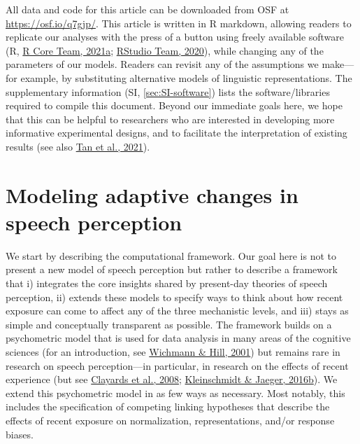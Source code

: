 \documentclass[
  11pt,
  english,
  man,floatsintext]{apa6}
\begin{document}
All data and code for this article can be downloaded from OSF at \url{https://osf.io/q7gjp/}. This article is written in R markdown, allowing readers to replicate our analyses with the press of a button using freely available software (R, \protect\hyperlink{ref-R}{R Core Team, 2021a}; \protect\hyperlink{ref-RStudio}{RStudio Team, 2020}), while changing any of the parameters of our models. Readers can revisit any of the assumptions we make---for example, by substituting alternative models of linguistic representations. The supplementary information (SI, \ref{sec:SI-software}) lists the software/libraries required to compile this document. Beyond our immediate goals here, we hope that this can be helpful to researchers who are interested in developing more informative experimental designs, and to facilitate the interpretation of existing results (see also \protect\hyperlink{ref-tan2021}{Tan et al., 2021}).

\hypertarget{sec:framework}{%
\section{Modeling adaptive changes in speech perception}\label{sec:framework}}

We start by describing the computational framework. Our goal here is not to present a new model of speech perception but rather to describe a framework that i) integrates the core insights shared by present-day theories of speech perception, ii) extends these models to specify ways to think about how recent exposure can come to affect any of the three mechanistic levels, and iii) stays as simple and conceptually transparent as possible. The framework builds on a psychometric model that is used for data analysis in many areas of the cognitive sciences (for an introduction, see \protect\hyperlink{ref-wichmann-hill2001}{Wichmann \& Hill, 2001}) but remains rare in research on speech perception---in particular, in research on the effects of recent experience (but see \protect\hyperlink{ref-clayards2008}{Clayards et al., 2008}; \protect\hyperlink{ref-kleinschmidt-jaeger2016cogsci}{Kleinschmidt \& Jaeger, 2016b}). We extend this psychometric model in as few ways as necessary. Most notably, this includes the specification of competing linking hypotheses that describe the effects of recent exposure on normalization, representations, and/or response biases.
\end{document}
